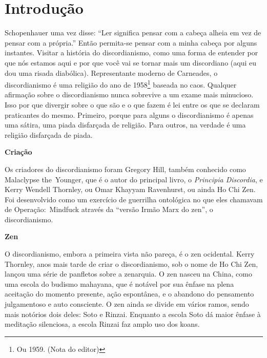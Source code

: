 \newpage
\chapter*{Introdução}

Schopenhauer uma vez disse: ``Ler significa pensar com a cabeça alheia em vez de pensar com a própria.'' Então per\-mi\-ta-se pensar com a minha cabeça por alguns instantes. Visitar a história do discordianismo, como uma forma de entender por que nós estamos aqui e por que você vai se tornar mais um discordiano (aqui eu dou uma risada diabólica). Representante moderno de Carneades, o discordianismo é uma religião do ano de 1958\footnote{Ou 1959. (Nota do editor)} baseada no caos. Qualquer afirmação sobre o discordianismo nunca sobrevive a um exame mais minucioso. Isso por que divergir sobre o que são e o que fazem é lei entre os que se declaram praticantes do mesmo. Primeiro, porque para alguns o discordianismo é apenas uma sátira, uma piada disfarçada de religião. Para outros, na verdade é uma religião disfarçada de piada.
 
\begin{flushleft}
{\Large \textbf{Criação}}
\end{flushleft}


\begin{sloppypar}
Os criadores do discordianismo foram Gregory Hill, também conhecido como Malaclypse the~Younger, que é o autor do principal livro, o \emph{Principia Discordia}, e Kerry Wendell Thornley, ou Omar Khayyam Ravenhurst, ou ainda Ho Chi Zen. Foi desenvolvido como um exercício de guerrilha ontológica no que eles chamavam de Operação:~Mindfuck através da ``versão Irmão Marx do zen'', o discordianismo.
\end{sloppypar}

\begin{flushleft}
{\Large \textbf{Zen}}
\end{flushleft}

O discordianismo, embora a primeira vista não pareça, é o zen ocidental. Kerry Thornley, anos mais tarde de criar o discordianismo, sob o nome de Ho Chi Zen, lançou uma série de panfletos sobre a zenarquia. O zen nasceu na China, como uma escola do budismo mahayana, que é notável por sua ênfase na plena aceitação do momento presente, ação espontânea, e o abandono do pensamento julgamentoso e auto consciente. O zen ainda se divide em vários ramos, sendo mais notórios dois deles: Soto e Rinzai. Enquanto a escola Soto dá maior ênfase à meditação silenciosa, a escola Rinzai faz amplo uso dos koans.

